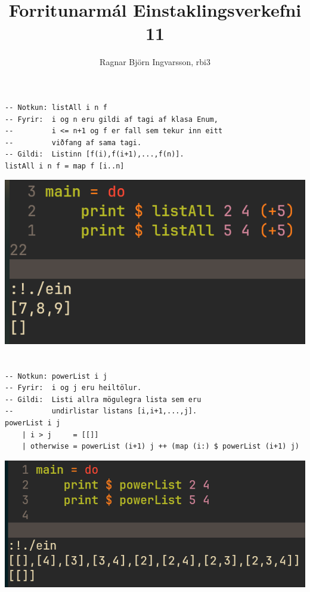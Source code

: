 \documentclass{article}
\title{Forritunarmál Einstaklingsverkefni 11}
\author{Ragnar Björn Ingvarsson, rbi3}
\begin{document}
\renewcommand\thepage{}

	\maketitle

	\newpage
	\setcounter{page}{1}
	\renewcommand\thepage{\arabic{page}}

	\section{}
	\begin{verbatim}
-- Notkun: listAll i n f
-- Fyrir:  i og n eru gildi af tagi af klasa Enum,
--         i <= n+1 og f er fall sem tekur inn eitt
--         viðfang af sama tagi.
-- Gildi:  Listinn [f(i),f(i+1),...,f(n)].
listAll i n f = map f [i..n]
	\end{verbatim}
	\begin{center}
		\includegraphics[scale=0.35]{listall.png}
	\end{center}

	\section{}
	\begin{verbatim}
-- Notkun: powerList i j
-- Fyrir:  i og j eru heiltölur.
-- Gildi:  Listi allra mögulegra lista sem eru
--         undirlistar listans [i,i+1,...,j].
powerList i j
    | i > j     = [[]]
    | otherwise = powerList (i+1) j ++ (map (i:) $ powerList (i+1) j)
	\end{verbatim}
	\begin{center}
		\includegraphics[scale=0.35]{powerlist.png}
	\end{center}
\end{document}
